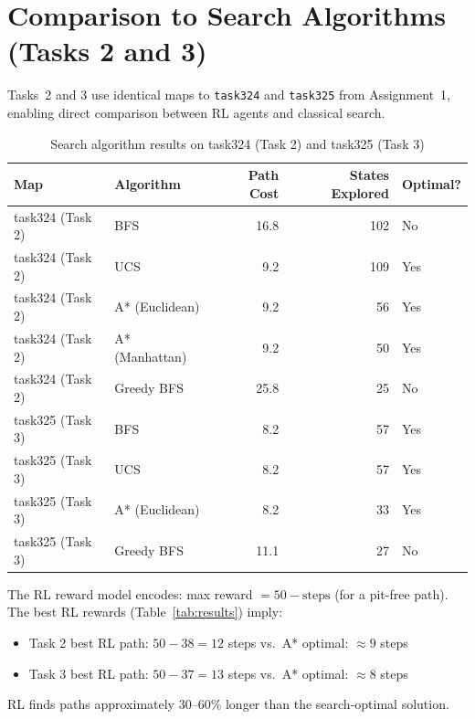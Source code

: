 \documentclass[11pt,letterpaper]{article}
\begin{document}
\section{Comparison to Search Algorithms (Tasks 2 and 3)}

Tasks~2 and 3 use identical maps to \texttt{task324} and \texttt{task325} from
Assignment~1, enabling direct comparison between RL agents and classical search.

\begin{table}[h!]
\centering
\caption{Search algorithm results on task324 (Task 2) and task325 (Task 3)}
\begin{tabular}{llrrl}
\toprule
\textbf{Map} & \textbf{Algorithm} & \textbf{Path Cost} & \textbf{States Explored} & \textbf{Optimal?} \\
\midrule
task324 (Task 2) & BFS           & 16.8 & 102 & No  \\
task324 (Task 2) & UCS           &  9.2 & 109 & Yes \\
task324 (Task 2) & A* (Euclidean)&  9.2 &  56 & Yes \\
task324 (Task 2) & A* (Manhattan)&  9.2 &  50 & Yes \\
task324 (Task 2) & Greedy BFS    & 25.8 &  25 & No  \\
\midrule
task325 (Task 3) & BFS           &  8.2 &  57 & Yes \\
task325 (Task 3) & UCS           &  8.2 &  57 & Yes \\
task325 (Task 3) & A* (Euclidean)&  8.2 &  33 & Yes \\
task325 (Task 3) & Greedy BFS    & 11.1 &  27 & No  \\
\bottomrule
\end{tabular}
\end{table}



The RL reward model encodes: max reward $= 50 - \text{steps}$ (for a pit-free path).
The best RL rewards (Table~\ref{tab:results}) imply:
\begin{itemize}[noitemsep]
  \item Task 2 best RL path: $50 - 38 = 12$ steps \quad vs.\ A* optimal: $\approx 9$ steps
  \item Task 3 best RL path: $50 - 37 = 13$ steps \quad vs.\ A* optimal: $\approx 8$ steps
\end{itemize}

RL finds paths approximately 30--60\% longer than the search-optimal solution.
\end{document}
